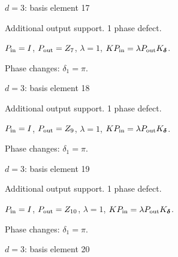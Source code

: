 \vfill
{\footnotesize\texttt{}}
\newpage
{}
{\Large $d=3$: basis element 17}\par
Additional output support. 1 phase defect.
\begin{center}
\end{center}
\vspace{-1mm}
$P_{\rm in}=I$, \quad $P_{\rm out}=Z_{7}$, \quad $\lambda=1$, \qquad $K P_{\rm in}=\lambda P_{\rm out}K_{\boldsymbol\delta}$.
\par\smallskip\begin{minipage}{.98\linewidth}\small Phase changes: $\delta_{1}=\pi$.\end{minipage}
\vfill
{\footnotesize\texttt{}}
\newpage
{}
{\Large $d=3$: basis element 18}\par
Additional output support. 1 phase defect.
\begin{center}
\end{center}
\vspace{-1mm}
$P_{\rm in}=I$, \quad $P_{\rm out}=Z_{9}$, \quad $\lambda=1$, \qquad $K P_{\rm in}=\lambda P_{\rm out}K_{\boldsymbol\delta}$.
\par\smallskip\begin{minipage}{.98\linewidth}\small Phase changes: $\delta_{1}=\pi$.\end{minipage}
\vfill
{\footnotesize\texttt{}}
\newpage
{}
{\Large $d=3$: basis element 19}\par
Additional output support. 1 phase defect.
\begin{center}
\end{center}
\vspace{-1mm}
$P_{\rm in}=I$, \quad $P_{\rm out}=Z_{10}$, \quad $\lambda=1$, \qquad $K P_{\rm in}=\lambda P_{\rm out}K_{\boldsymbol\delta}$.
\par\smallskip\begin{minipage}{.98\linewidth}\small Phase changes: $\delta_{1}=\pi$.\end{minipage}
\vfill
{\footnotesize\texttt{}}
\newpage
{}
{\Large $d=3$: basis element 20}\par

